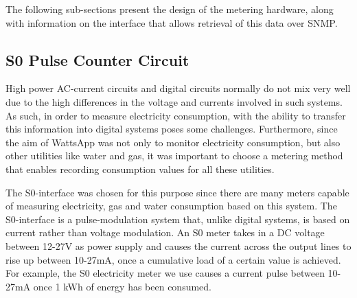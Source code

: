 \documentclass[10pt, conference, compsocconf, english]{IEEEtran}
\begin{document}
The following sub-sections present the design of the metering hardware,
along with information on the interface that allows retrieval of this
data over SNMP.


\subsection{S0 Pulse Counter Circuit}

High power AC-current circuits and digital circuits normally do not
mix very well due to the high differences in the voltage and currents
involved in such systems. As such, in order to measure electricity
consumption, with the ability to transfer this information into digital
systems poses some challenges. Furthermore, since the aim of WattsApp
was not only to monitor electricity consumption, but also other utilities
like water and gas, it was important to choose a metering method that
enables recording consumption values for all these utilities.

The S0-interface was chosen for this purpose since there are many
meters capable of measuring electricity, gas and water consumption
based on this system. The S0-interface is a pulse-modulation system
that, unlike digital systems, is based on current rather than voltage
modulation. An S0 meter takes in a DC voltage between 12-27V as power
supply and causes the current across the output lines to rise up between
10-27mA, once a cumulative load of a certain value is achieved. For
example, the S0 electricity meter we use causes a current pulse between
10-27mA once 1 kWh of energy has been consumed.
\end{document}
